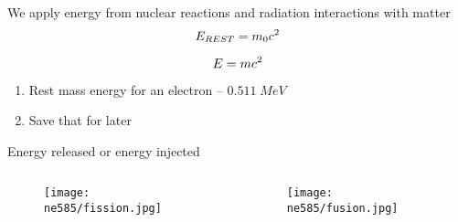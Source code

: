 \documentclass[aspectratio=1610,pdftex,dvipsnames,compress,xcolor={dvipsnames}]{beamer}
\begin{document}
\addtocounter{framenumber}{-1}
\begin{frame}{We apply energy from nuclear reactions and radiation interactions with matter}
    \begin{equation}
        \LARGE
        E_{REST} = m_0 c^2
    \end{equation}

    \begin{equation}
        \LARGE
        E = m c^2
    \end{equation}

    \vspace*{\fill}

    \begin{enumerate}[series=outerlist,topsep=0pt,itemsep=21pt,leftmargin=*,label=(\arabic*)]
        \item[]Rest mass energy for an electron -- $0.511 \; MeV$
        \item[]Save that for later
    \end{enumerate}
\end{frame}


\begin{frame}{Energy released or energy injected}
    \begin{columns}

        \begin{column}{0.50\textwidth}
            \begin{figure}
                \centering
                \texttt{[image: ne585/fission.jpg]}
            \end{figure}
        \end{column}

        \begin{column}{0.50\textwidth}
            \begin{figure}
                \centering
                \texttt{[image: ne585/fusion.jpg]}
            \end{figure}
        \end{column}

    \end{columns}
\end{frame}
\end{document}
